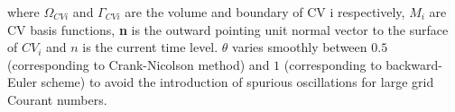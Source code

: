 \documentclass[preprint,authoryear,12pt]{elsarticle}
\begin{document}
 

\noindent
where $\Omega_{CVi}$ and $\Gamma_{CVi}$ are the volume and boundary of CV i respectively, $M_{i}$ are CV basis functions, \textbf{n} is the outward pointing unit normal vector to the surface of $CV_{i}$ and $n$ is the current time level. $\theta$ varies smoothly between $0.5$ (corresponding to Crank-Nicolson method) and $1$ (corresponding to backward-Euler scheme) to avoid the introduction of spurious oscillations for large grid Courant numbers.

\end{document}
